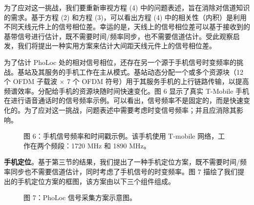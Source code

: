 \documentclass[journal, onecolumn]{IEEEtran}
\begin{document}
为了应对这一挑战，我们要重新审视方程 (4) 中的问题表述，旨在消除对信道知识的需求。基于方程 (2) 和方程 (3)，可以看出方程 (4) 中的相关性（内积）是利用不同天线元件上的信号相位差。幸运的是，天线上的信号相位差可以基于接收到的基带信号进行估计，既不需要时间/频率同步，也不需要信道估计。受此观察启发，我们将提出一种实用方案来估计大间距天线元件上的信号相位差。

为了估计 PhoLoc 处的相对信号相位，还存在另一个源于手机信号时变频率的挑战。基站及其服务的手机工作在主从模式。基站动态分配一个或多个资源块（12 个 OFDM 子载波 $\times$ 7 个 OFDM 符号）用于其服务手机的上行链路传输，以提高频谱效率。分配给手机的资源块随时间快速变化。图 6 显示了真实 T-Mobile 手机在进行语音通话时的信号频率示例。可以看出，信号频率不是固定的，而是快速变化的。为了应对这一挑战，问题表述中需要考虑时变信号频率；并且应消除其影响。

\begin{figure}[htbp]
\centering
\caption{图 6：手机信号频率和时间戳示例。该手机使用 T-mobile 网络，工作在两个频段：1720 MHz 和 1890 MHz。}
\label{fig:6}
\end{figure}

\textbf{手机定位}。基于第三节的结果，我们提出了一种手机定位方案，既不需要时间/频率同步也不需要信道估计，同时考虑了手机信号的时变频率。图 7 描绘了我们提出的手机定位方案的框图，该方案由以下三个组件组成。

\begin{figure}[htbp]
\centering
\caption{图 7：PhoLoc 信号采集方案示意图。}
\label{fig:7}
\end{figure}
\end{document}
